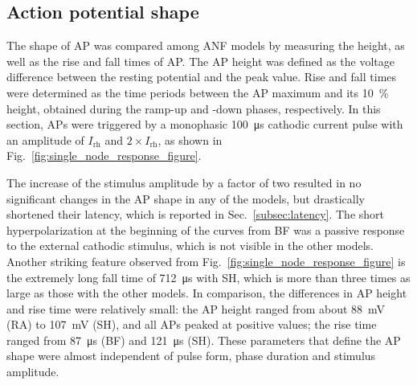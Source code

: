 \documentclass[utf8]{frontiersSCNS} %
\newcommand{\T}[1]{\text{#1}}
\begin{document}
\subsection{Action potential shape}
\label{subsec:AP_shape}
The shape of AP was compared among ANF models by measuring the height, as well as the rise and fall times of AP. The AP height was defined as the voltage difference between the resting potential and the peak value. Rise and fall times were determined as the time periods between the AP maximum and its \SI{10}{\percent} height, obtained during the ramp-up and -down phases, respectively. In this section, APs were triggered by a monophasic \SI{100}{\micro\second} cathodic current pulse with an amplitude of $I_{\T{rh}}$ and $2\times I_{\T{rh}}$, as shown in Fig.\ \ref{fig:single_node_response_figure}.

The increase of the stimulus amplitude by a factor of two resulted in no significant changes in the AP shape in any of the models, but drastically shortened their latency, which is reported in Sec.\ \ref{subsec:latency}.
The short hyperpolarization at the beginning of the curves from BF was a passive response to the external cathodic stimulus, which is not visible in the other models. Another striking feature observed from Fig.\ \ref{fig:single_node_response_figure} is the extremely long fall time of \SI{712}{\micro\second} with SH, which is more than three times as large as those with the other models. In comparison, the differences in AP height and rise time were relatively small: the AP height ranged from about \SI{88}{\milli\volt} (RA) to \SI{107}{\milli\volt} (SH), and all APs peaked at positive values; the rise time ranged from \SI{87}{\micro\second} (BF) and \SI{121}{\micro\second} (SH). These parameters that define the AP shape were almost independent of pulse form, phase duration and stimulus amplitude.

%
%
%
\end{document}
